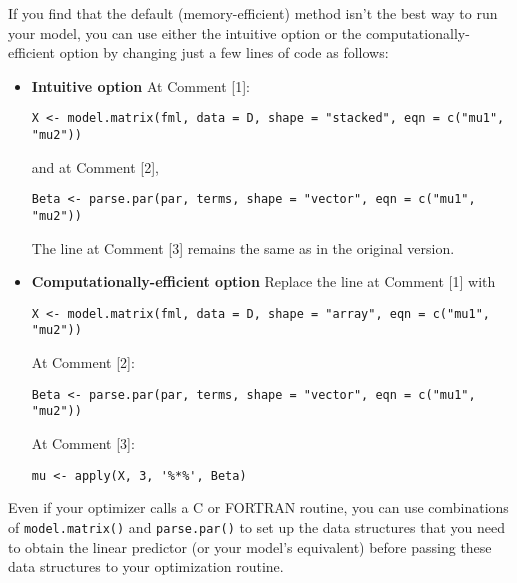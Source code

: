 If you find that the default (memory-efficient) method isn't the best
way to run your model, you can use either the intuitive option or the
computationally-efficient option by changing just a few lines of code
as follows:
\begin{itemize}  
\item {\bf Intuitive option}  At Comment [1]:
\begin{verbatim}
X <- model.matrix(fml, data = D, shape = "stacked", eqn = c("mu1", "mu2"))
\end{verbatim}
and at Comment [2],
\begin{verbatim}
Beta <- parse.par(par, terms, shape = "vector", eqn = c("mu1", "mu2"))
\end{verbatim}
The line at Comment [3] remains the same as in the original version.  

\item {\bf Computationally-efficient option} Replace the line at Comment [1] with
\begin{verbatim}
X <- model.matrix(fml, data = D, shape = "array", eqn = c("mu1", "mu2"))
\end{verbatim}
At Comment [2]:
\begin{verbatim}
Beta <- parse.par(par, terms, shape = "vector", eqn = c("mu1", "mu2"))
\end{verbatim}
At Comment [3]:  
\begin{verbatim}
mu <- apply(X, 3, '%*%', Beta)
\end{verbatim}
\end{itemize}  

Even if your optimizer calls a C or FORTRAN routine, you can use
combinations of {\tt model.matrix()} and {\tt parse.par()} to set up
the data structures that you need to obtain the linear predictor (or
your model's equivalent) before passing these data structures to your
optimization routine.  


